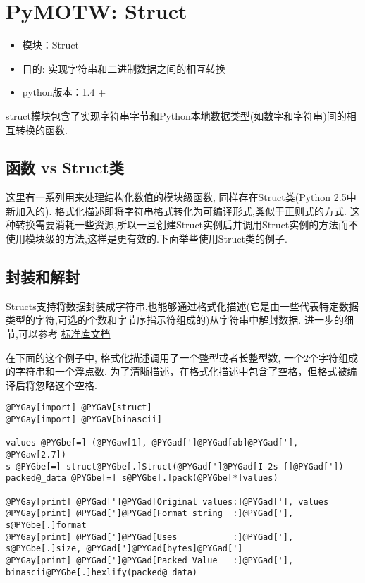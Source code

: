 \documentclass[a4paper,10pt,english]{manual}
\begin{document}
\section{PyMOTW: Struct}
\begin{itemize}
\item {} 
模块：Struct

\item {} 
目的: 实现字符串和二进制数据之间的相互转换

\item {} 
python版本：1.4 +

\end{itemize}

struct模块包含了实现字符串字节和Python本地数据类型(如数字和字符串)间的相互转换的函数.


\subsection{函数 vs Struct类}

这里有一系列用来处理结构化数值的模块级函数, 同样存在Struct类(Python 2.5中新加入的). 格式化描述即将字符串格式转化为可编译形式,类似于正则式的方式. 这种转换需要消耗一些资源,所以一旦创建Struct实例后并调用Struct实例的方法而不使用模块级的方法,这样是更有效的.下面举些使用Struct类的例子.


\subsection{封装和解封}

Structs支持将数据封装成字符串,也能够通过格式化描述(它是由一些代表特定数据类型的字符,可选的个数和字节序指示符组成的)从字符串中解封数据. 进一步的细节,可以参考 \href{http://docs.python.org/library/struct.html}{标准库文档}

在下面的这个例子中, 格式化描述调用了一个整型或者长整型数, 一个2个字符组成的字符串和一个浮点数. 为了清晰描述，在格式化描述中包含了空格，但格式被编译后将忽略这个空格.

\begin{Verbatim}[commandchars=@\[\]]
@PYGay[import] @PYGaV[struct]
@PYGay[import] @PYGaV[binascii]

values @PYGbe[=] (@PYGaw[1], @PYGad[']@PYGad[ab]@PYGad['], @PYGaw[2.7])
s @PYGbe[=] struct@PYGbe[.]Struct(@PYGad[']@PYGad[I 2s f]@PYGad['])
packed@_data @PYGbe[=] s@PYGbe[.]pack(@PYGbe[*]values)

@PYGay[print] @PYGad[']@PYGad[Original values:]@PYGad['], values
@PYGay[print] @PYGad[']@PYGad[Format string  :]@PYGad['], s@PYGbe[.]format
@PYGay[print] @PYGad[']@PYGad[Uses           :]@PYGad['], s@PYGbe[.]size, @PYGad[']@PYGad[bytes]@PYGad[']
@PYGay[print] @PYGad[']@PYGad[Packed Value   :]@PYGad['], binascii@PYGbe[.]hexlify(packed@_data)
\end{Verbatim}
\end{document}
